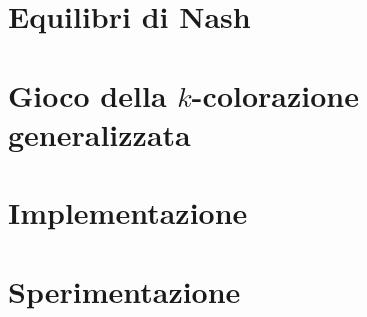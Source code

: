 \documentclass[11pt,a4paper,oneside,openany]{book}
\begin{document}
    
    \tableofcontents
    
    \part{Equilibri di Nash}    
    
    
    \part{Gioco della $k$-colorazione generalizzata}
    
    
    \part{Implementazione}
    

	\part{Sperimentazione}
	
	
	\newpage
	\nocite{*}
	\printbibliography
	
	
	
\end{document}
